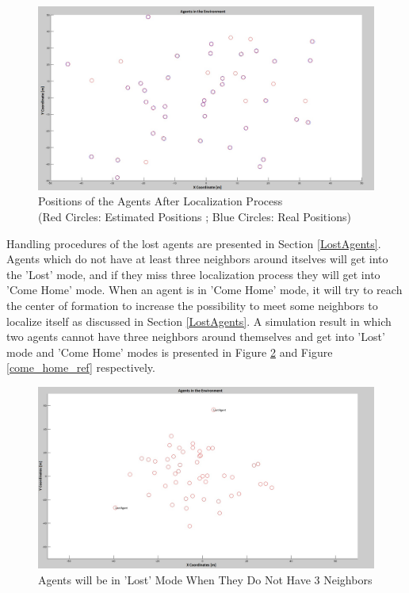 \begin{figure}[H]
\centering
\captionsetup{format=hang,justification=centerfirst}
\caption{Positions of the Agents After Localization Process \\
(Red Circles: Estimated Positions ; Blue Circles: Real Positions)} \label{duzgun_pos_ref}
\centerline{\includegraphics[scale = 0.27]{Pozisyon-1-Duzeltilmis}}
\end{figure} 
		
Handling procedures of the lost agents are presented in Section \ref{LostAgents}. Agents which do not have at least three neighbors around itselves will get into the 'Lost' mode, and if  they miss three localization process they will get into 'Come Home' mode. When an agent is in 'Come Home' mode, it will try to reach the center of formation to increase the possibility to meet some neighbors to localize itself as discussed in Section \ref{LostAgents}. A simulation result in which two agents cannot have three neighbors around themselves and get into 'Lost' mode and 'Come Home' modes  is presented in Figure \ref{lost_ref} and Figure \ref{come_home_ref} respectively.
		
\begin{figure}[H]
\caption{Agents will be in 'Lost' Mode When They Do Not Have 3 Neighbors} \label{lost_ref}
\centering
\centerline{\includegraphics[scale = 0.27]{Lost-2-2}}
\end{figure} 

